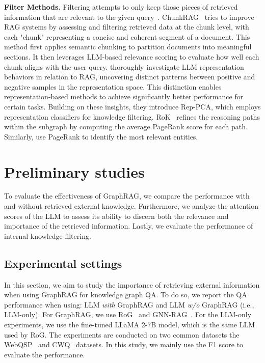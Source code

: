 \documentclass[11pt]{article}
\newcommand{\jt}[1]{{\color{red}[JT:#1]}}
\newcommand{\harry}[1]{{\color{orange}[Harry:#1]}}
\newcommand{\kai}[1]{{\color{blue}[Kai:#1]}}
\begin{document}
\textbf{Filter Methods.}
Filtering attempts to only keep those pieces of retrieved information that are relevant to the given query~\cite{gao2025frag}.
ChunkRAG~\cite{singh2024chunkrag} tries to improve RAG systems by assessing and filtering retrieved data at the chunk level, with each "chunk" representing a concise and coherent segment of a document. This method first applies semantic chunking to partition documents into meaningful sections. It then leverages LLM-based relevance scoring to evaluate how well each chunk aligns with the user query.
\citet{zeng2024towards} thoroughly investigate LLM representation behaviors in relation to RAG, uncovering distinct patterns between positive and negative samples in the representation space. This distinction enables representation-based methods to achieve significantly better performance for certain tasks. Building on these insights, they introduce Rep-PCA, which employs representation classifiers for knowledge filtering.
RoK~\cite{wang2024reasoning} refines the reasoning paths within the subgraph by computing the average PageRank score for each path. Similarly, \citet{he2024g} use PageRank to identify the most relevant entities.


\section{Preliminary studies}
\label{sec: Preliminary}
To evaluate the effectiveness of GraphRAG, we compare the performance with and without retrieved external knowledge. Furthermore, we analyze the attention scores of the LLM to assess its ability to discern both the relevance and importance of the retrieved information. Lastly, we evaluate the performance of internal knowledge filtering.

\subsection{Experimental settings}


In this section, we aim to study the importance of retrieving external information when using GraphRAG for knowledge graph QA. To do so, we report the QA performance when using: LLM {\it with} GraphRAG and LLM {\it w/o} GraphRAG (i.e., LLM-only).
For GraphRAG, we use RoG~\cite{luo2024rog} and GNN-RAG~\cite{mavromatis2024gnn}. 
For the LLM-only experiments, we use the fine-tuned LLaMA 2-7B model, which is the same LLM used by RoG. The experiments are conducted on two common datasets the WebQSP~\cite{yih2016value} and CWQ~\cite{talmor2018web} datasets. In this study, we mainly use the F1 score to evaluate the performance.
\end{document}
